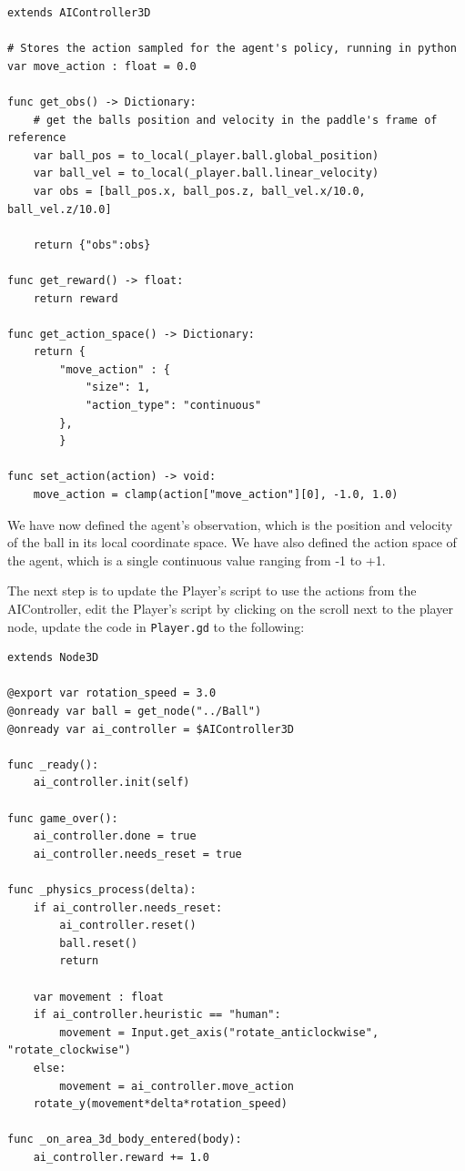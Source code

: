 \documentclass[11pt,a4paper]{article}
\begin{document}
\begin{lstlisting}
extends AIController3D

# Stores the action sampled for the agent's policy, running in python
var move_action : float = 0.0

func get_obs() -> Dictionary:
	# get the balls position and velocity in the paddle's frame of reference
	var ball_pos = to_local(_player.ball.global_position)
	var ball_vel = to_local(_player.ball.linear_velocity)
	var obs = [ball_pos.x, ball_pos.z, ball_vel.x/10.0, ball_vel.z/10.0]

	return {"obs":obs}

func get_reward() -> float:
	return reward

func get_action_space() -> Dictionary:
	return {
		"move_action" : {
			"size": 1,
			"action_type": "continuous"
		},
		}

func set_action(action) -> void:
	move_action = clamp(action["move_action"][0], -1.0, 1.0)
\end{lstlisting}

We have now defined the agent's observation, which is the position and velocity of the ball in its local coordinate space. We have also defined the action space of the agent, which is a single continuous value ranging from -1 to +1.

The next step is to update the Player's script to use the actions from the AIController, edit the Player's script by clicking on the scroll next to the player node, update the code in \texttt{Player.gd} to the following:

\begin{lstlisting}
extends Node3D

@export var rotation_speed = 3.0
@onready var ball = get_node("../Ball")
@onready var ai_controller = $AIController3D

func _ready():
	ai_controller.init(self)

func game_over():
	ai_controller.done = true
	ai_controller.needs_reset = true

func _physics_process(delta):
	if ai_controller.needs_reset:
		ai_controller.reset()
		ball.reset()
		return

	var movement : float
	if ai_controller.heuristic == "human":
		movement = Input.get_axis("rotate_anticlockwise", "rotate_clockwise")
	else:
		movement = ai_controller.move_action
	rotate_y(movement*delta*rotation_speed)

func _on_area_3d_body_entered(body):
	ai_controller.reward += 1.0
\end{lstlisting}
\end{document}

